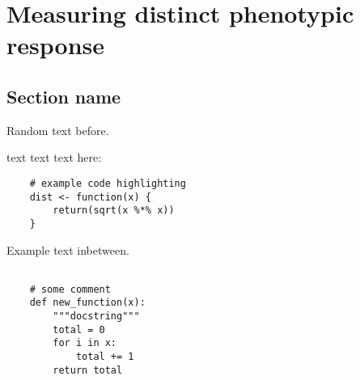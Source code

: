 \documentclass[a4paper,11pt,twoside,openright]{scrbook}
\begin{document}
\chapter{Measuring distinct phenotypic response} \label{chapter:tccs}

\section{Section name}




Random text before.

text text text here:

\begin{verbatim}
    # example code highlighting
    dist <- function(x) {
        return(sqrt(x %*% x))
    }
\end{verbatim}

Example text inbetween.

\begin{footnotesize}
\begin{verbatim}

    # some comment
    def new_function(x):
        """docstring"""
        total = 0
        for i in x:
            total += 1
        return total

\end{verbatim}
\end{footnotesize}
\end{document}

